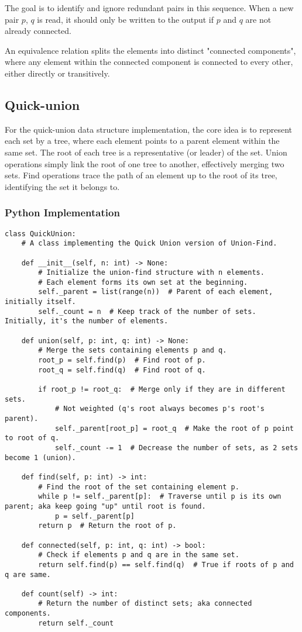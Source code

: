 \documentclass{article}
\begin{document}
The goal is to identify and ignore redundant pairs in this sequence. When a new pair $p$, $q$ is read, it should only be written to the output if $p$ and $q$ are not already connected.

An equivalence relation splits the elements into distinct "connected components", where any element within the connected component is connected to every other, either directly or transitively.

\subsection{Quick-union}

For the quick-union data structure implementation, the core idea is to represent each set by a tree, where each element points to a parent element within the same set. The root of each tree is a representative (or leader) of the set. Union operations simply link the root of one tree to another, effectively merging two sets. Find operations trace the path of an element up to the root of its tree, identifying the set it belongs to. 

\subsubsection*{Python Implementation}

\begin{verbatim}
class QuickUnion:
    # A class implementing the Quick Union version of Union-Find.

    def __init__(self, n: int) -> None:
        # Initialize the union-find structure with n elements.
        # Each element forms its own set at the beginning.
        self._parent = list(range(n))  # Parent of each element, initially itself.
        self._count = n  # Keep track of the number of sets. Initially, it's the number of elements.

    def union(self, p: int, q: int) -> None:
        # Merge the sets containing elements p and q.
        root_p = self.find(p)  # Find root of p.
        root_q = self.find(q)  # Find root of q.
        
        if root_p != root_q:  # Merge only if they are in different sets.
            # Not weighted (q's root always becomes p's root's parent).
            self._parent[root_p] = root_q  # Make the root of p point to root of q. 
            self._count -= 1  # Decrease the number of sets, as 2 sets become 1 (union).

    def find(self, p: int) -> int:
        # Find the root of the set containing element p.
        while p != self._parent[p]:  # Traverse until p is its own parent; aka keep going "up" until root is found.
            p = self._parent[p]
        return p  # Return the root of p.

    def connected(self, p: int, q: int) -> bool:
        # Check if elements p and q are in the same set.
        return self.find(p) == self.find(q)  # True if roots of p and q are same.

    def count(self) -> int:
        # Return the number of distinct sets; aka connected components.
        return self._count
\end{verbatim}
\end{document}
